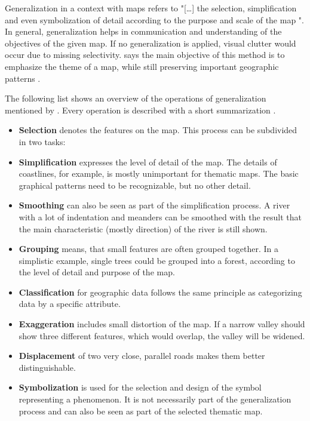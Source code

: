 Generalization in a context with maps refers to "[\ldots] the selection, simplification and even symbolization of detail according to the purpose and scale of the map ".
In general, generalization helps in communication and understanding of the objectives of the given map. If no generalization is applied, visual clutter would occur due to missing selectivity. \citeauthor{Tyner2010} says the main objective of this method is to emphasize the theme of a map, while still preserving important geographic patterns .

The following list shows an overview of the operations of generalization mentioned by \citeauthor{Tyner2010}. Every operation is described with a short summarization .

\begin{itemize}
\item \textbf{Selection} denotes the features on the map. This process can be subdivided in two tasks:


\item \textbf{Simplification} expresses the level of detail of the map. The details of coastlines, for example, is mostly unimportant for thematic maps. The basic graphical patterns need to be recognizable, but no other detail.

\item \textbf{Smoothing} can also be seen as part of the simplification process. A river with a lot of indentation and meanders can be smoothed with the result that the main characteristic (mostly direction) of the river is still shown.

\item \textbf{Grouping} means, that small features are often grouped together. In a simplistic example, single trees could be grouped into a forest, according to the level of detail and purpose of the map.

\item \textbf{Classification} for geographic data follows the same principle as categorizing data by a specific attribute.

\item \textbf{Exaggeration} includes small distortion of the map. If a narrow valley should show three different features, which would overlap, the valley will be widened.

\item \textbf{Displacement} of two very close, parallel roads makes them better distinguishable.

\item \textbf{Symbolization} is used for the selection and design of the symbol representing a phenomenon. It is not necessarily part of the generalization process and can also be seen as part of the selected thematic map.

\end{itemize}
